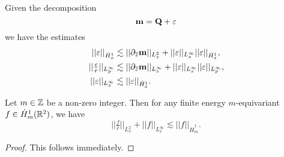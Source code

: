 \begin{proposition}
   Given the decomposition  
        \[
            {\bf m} = {\bf Q} + \varepsilon 
        \]
    we have the estimates 
        \begin{align*}
            ||\varepsilon||_{\dot H^1_x}    
                &\lesssim || \partial_{\overline z} {\bf m}||_{L^2_x} + ||\varepsilon||_{L^\infty_x} ||\varepsilon||_{\dot H^1_x}, \\
            ||\tfrac{\varepsilon}{r}||_{L^\infty_p} 
                &\lesssim ||\partial_{\overline z} {\bf m}||_{L^\infty_x} + ||\varepsilon||_{L^\infty_x} ||\varepsilon||_{L^\infty_p},\\
            ||\varepsilon||_{L^\infty_x}
                &\lesssim ||\varepsilon||_{\dot H^1_x}. 
        \end{align*}
\end{proposition}

\begin{proposition}
    Let $m \in \mathbb Z$ be a non-zero integer. Then for any finite energy $m$-equivariant $f \in \dot H^1_m (\mathbb R^2)$, we have 
        \begin{equation}\label{eq:hardy}
            ||\tfrac{f}{r}||_{L^2_x} + ||f||_{L^\infty_x} 
                \lesssim ||f||_{\dot H^1_m}.
        \end{equation}
\end{proposition}

\begin{proof}
    This follows immediately. 
\end{proof}